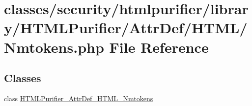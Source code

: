 \hypertarget{Nmtokens_8php}{\section{classes/security/htmlpurifier/library/\+H\+T\+M\+L\+Purifier/\+Attr\+Def/\+H\+T\+M\+L/\+Nmtokens.php File Reference}
\label{Nmtokens_8php}
}
\subsection*{Classes}
\begin{DoxyCompactItemize}
\item 
class \hyperlink{classHTMLPurifier__AttrDef__HTML__Nmtokens}{H\+T\+M\+L\+Purifier\+\_\+\+Attr\+Def\+\_\+\+H\+T\+M\+L\+\_\+\+Nmtokens}
\end{DoxyCompactItemize}
